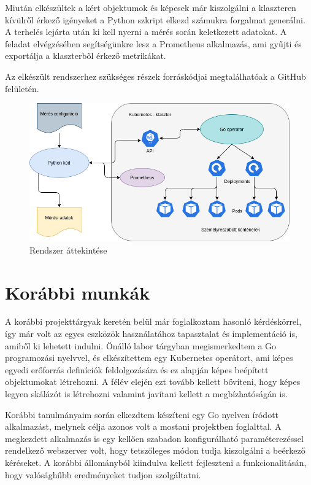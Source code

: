 Miután elkészültek a kért objektumok és képesek már kiszolgálni a klaszteren kívülről érkező igényeket a Python szkript elkezd számukra forgalmat generálni.
A terhelés lejárta után ki kell nyerni a mérés során keletkezett adatokat.
A feladat elvégzésében segítségünkre lesz a Prometheus\citep{Prometheus} alkalmazás, ami gyűjti és exportálja a klaszterből érkező metrikákat. 

Az elkészült rendszerhez szükséges részek forráskódjai megtalálhatóak a GitHub felületén\citep{gitRepo}. 

\begin{figure}[!ht]
\centering
\includegraphics[width=150mm, keepaspectratio]{figures/system_overview.png}
\caption{Rendszer áttekintése}
\label{fig:system_overview}
\end{figure}

\section{Korábbi munkák}
A korábbi projekttárgyak keretén belül már foglalkoztam hasonló kérdéskörrel, így már volt az egyes eszközök használatához tapasztalat és implementáció is, amiből ki lehetett indulni. 
Önálló labor tárgyban megismerkedtem a Go programozási nyelvvel, és elkészítettem egy Kubernetes operátort, ami képes egyedi erőforrás definíciók feldolgozására és ez alapján képes beépített objektumokat létrehozni.
A félév elején ezt tovább kellett bővíteni, hogy képes legyen skálázót is létrehozni valamint javítani kellett a megbízhatóságán is.

Korábbi tanulmányaim során elkezdtem készíteni egy Go nyelven íródott alkalmazást, melynek célja azonos volt a mostani projektben foglalttal.
A megkezdett alkalmazás is egy kellően szabadon konfigurálható paraméterezéssel rendelkező webszerver volt, hogy tetszőleges módon tudja kiszolgálni a beérkező kéréseket. 
A korábbi állományból kiindulva kellett fejleszteni a funkcionalitásán, hogy valósághűbb eredményeket tudjon szolgáltatni.


